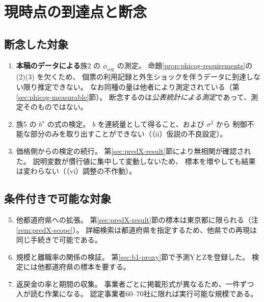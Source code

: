 \section{現時点の到達点と断念}

\subsection{断念した対象}

\begin{enumerate}[label=(\arabic*)]
\item \textbf{本稿のデータによる}族2 の $\phi_{\mathrm{cog}}$ の測定。
命題\ref{prop:phicog-requirements}の (2)(3) を欠くため、
個票の利用記録と外生ショックを伴うデータに到達しない限り推定できない。
なお同種の量は他者により測定されている（第\ref{sec:phicog-measurable}節）。
断念するのは\emph{公表統計による測定}であって、測定そのものではない。

\item 族5 の $b^\star$ の式の検定。
$b$ を連続量として得ること、および $\sigma^2$ から
制御不能な部分のみを取り出すことができない（（ii）仮説の不良設定）。

\item 価格側からの検定の続行。
第\ref{sec:predX-result}節により無相関が確認された。
説明変数が慣行値に集中して変動しないため、
標本を増やしても結果は変わらない（（vi）調整の不作動）。

\end{enumerate}

\subsection{条件付きで可能な対象}

\begin{enumerate}[label=(\arabic*)]
\setcounter{enumi}{4}
\item 他都道府県への拡張。
第\ref{sec:predX-result}節の標本は東京都に限られる（注\ref{rem:predX-scope}）。
詳細検索は都道府県を指定するため、他県での再現は同じ手続きで可能である。

\item 規模と離職率の関係の検証。
第\ref{sec:b1-proxy}節で予測YとZを登録した。
検定には他都道府県の標本を要する。

\item 返戻金の率と期間の収集。
事業者ごとに掲載形式が異なるため、一件ずつ人が読む作業になる。
認定事業者60--70社に限れば実行可能な規模である。
\end{enumerate}

